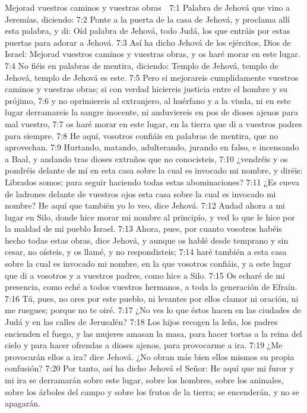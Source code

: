 Mejorad vuestros caminos y vuestras obras  

7:1 Palabra de Jehová que vino a Jeremías, diciendo:  
7:2 Ponte a la puerta de la casa de Jehová, y proclama allí esta palabra, y di: Oíd palabra de Jehová, todo Judá, los que entráis por estas puertas para adorar a Jehová.  
7:3 Así ha dicho Jehová de los ejércitos, Dios de Israel: Mejorad vuestros caminos y vuestras obras, y os haré morar en este lugar.  
7:4 No fiéis en palabras de mentira, diciendo: Templo de Jehová, templo de Jehová, templo de Jehová es este.  
7:5 Pero si mejorareis cumplidamente vuestros caminos y vuestras obras; si con verdad hiciereis justicia entre el hombre y su prójimo,  
7:6 y no oprimiereis al extranjero, al huérfano y a la viuda, ni en este lugar derramareis la sangre inocente, ni anduviereis en pos de dioses ajenos para mal vuestro,  
7:7 os haré morar en este lugar, en la tierra que di a vuestros padres para siempre. 
7:8 He aquí, vosotros confiáis en palabras de mentira, que no aprovechan.  
7:9 Hurtando, matando, adulterando, jurando en falso, e incensando a Baal, y andando tras dioses extraños que no conocisteis,  
7:10 ¿vendréis y os pondréis delante de mí en esta casa sobre la cual es invocado mi nombre, y diréis: Librados somos; para seguir haciendo todas estas abominaciones?  
7:11 ¿Es cueva de ladrones delante de vuestros ojos esta casa sobre la cual es invocado mi nombre? He aquí que también yo lo veo, dice Jehová.  
7:12 Andad ahora a mi lugar en Silo, donde hice morar mi nombre al principio, y ved lo que le hice por la maldad de mi pueblo Israel.  
7:13 Ahora, pues, por cuanto vosotros habéis hecho todas estas obras, dice Jehová, y aunque os hablé desde temprano y sin cesar, no oísteis, y os llamé, y no respondisteis;  
7:14 haré también a esta casa sobre la cual es invocado mi nombre, en la que vosotros confiáis, y a este lugar que di a vosotros y a vuestros padres, como hice a Silo. 
7:15 Os echaré de mi presencia, como eché a todos vuestros hermanos, a toda la generación de Efraín.  
7:16 Tú, pues, no ores por este pueblo, ni levantes por ellos clamor ni oración, ni me ruegues; porque no te oiré.  
7:17 ¿No ves lo que éstos hacen en las ciudades de Judá y en las calles de Jerusalén?  
7:18 Los hijos recogen la leña, los padres encienden el fuego, y las mujeres amasan la masa, para hacer tortas a la reina del cielo y para hacer ofrendas a dioses ajenos, para provocarme a ira.  
7:19 ¿Me provocarán ellos a ira? dice Jehová. ¿No obran más bien ellos mismos su propia confusión?  
7:20 Por tanto, así ha dicho Jehová el Señor: He aquí que mi furor y mi ira se derramarán sobre este lugar, sobre los hombres, sobre los animales, sobre los árboles del campo y sobre los frutos de la tierra; se encenderán, y no se apagarán.  
